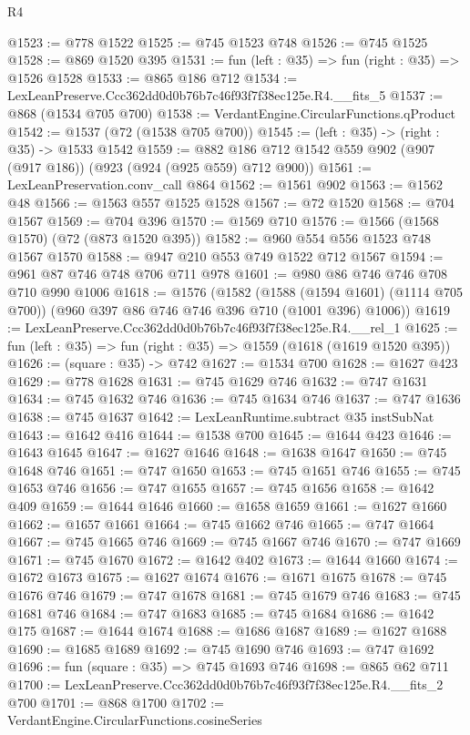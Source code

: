 \begin{lexlean}{R4}
\begin{coremodule}
@1523 := @778 @1522
@1525 := @745 @1523 @748
@1526 := @745 @1525
@1528 := @869 @1520 @395
@1531 := fun (left : @35) => fun (right : @35) => @1526 @1528
@1533 := @865 @186 @712
@1534 := LexLeanPreserve.Ccc362dd0d0b76b7c46f93f7f38ec125e.R4.__fits_5
@1537 := @868 (@1534 @705 @700)
@1538 := VerdantEngine.CircularFunctions.qProduct
@1542 := @1537 (@72 (@1538 @705 @700))
@1545 := (left : @35) -> (right : @35) -> @1533 @1542
@1559 := @882 @186 @712 @1542 @559 @902 (@907 (@917 @186)) (@923 (@924 (@925 @559) @712 @900))
@1561 := LexLeanPreservation.conv_call @864
@1562 := @1561 @902
@1563 := @1562 @48
@1566 := @1563 @557 @1525 @1528
@1567 := @72 @1520
@1568 := @704 @1567
@1569 := @704 @396
@1570 := @1569 @710
@1576 := @1566 (@1568 @1570) (@72 (@873 @1520 @395))
@1582 := @960 @554 @556 @1523 @748 @1567 @1570
@1588 := @947 @210 @553 @749 @1522 @712 @1567
@1594 := @961 @87 @746 @748 @706 @711 @978
@1601 := @980 @86 @746 @746 @708 @710 @990 @1006
@1618 := @1576
    (@1582
      (@1588 (@1594 @1601) (@1114 @705 @700))
      (@960 @397 @86 @746 @746 @396 @710 (@1001 @396) @1006))
@1619 := LexLeanPreserve.Ccc362dd0d0b76b7c46f93f7f38ec125e.R4.__rel_1
@1625 := fun (left : @35) => fun (right : @35) => @1559 (@1618 (@1619 @1520 @395))
@1626 := (square : @35) -> @742
@1627 := @1534 @700
@1628 := @1627 @423
@1629 := @778 @1628
@1631 := @745 @1629 @746
@1632 := @747 @1631
@1634 := @745 @1632 @746
@1636 := @745 @1634 @746
@1637 := @747 @1636
@1638 := @745 @1637
@1642 := LexLeanRuntime.subtract @35 instSubNat
@1643 := @1642 @416
@1644 := @1538 @700
@1645 := @1644 @423
@1646 := @1643 @1645
@1647 := @1627 @1646
@1648 := @1638 @1647
@1650 := @745 @1648 @746
@1651 := @747 @1650
@1653 := @745 @1651 @746
@1655 := @745 @1653 @746
@1656 := @747 @1655
@1657 := @745 @1656
@1658 := @1642 @409
@1659 := @1644 @1646
@1660 := @1658 @1659
@1661 := @1627 @1660
@1662 := @1657 @1661
@1664 := @745 @1662 @746
@1665 := @747 @1664
@1667 := @745 @1665 @746
@1669 := @745 @1667 @746
@1670 := @747 @1669
@1671 := @745 @1670
@1672 := @1642 @402
@1673 := @1644 @1660
@1674 := @1672 @1673
@1675 := @1627 @1674
@1676 := @1671 @1675
@1678 := @745 @1676 @746
@1679 := @747 @1678
@1681 := @745 @1679 @746
@1683 := @745 @1681 @746
@1684 := @747 @1683
@1685 := @745 @1684
@1686 := @1642 @175
@1687 := @1644 @1674
@1688 := @1686 @1687
@1689 := @1627 @1688
@1690 := @1685 @1689
@1692 := @745 @1690 @746
@1693 := @747 @1692
@1696 := fun (square : @35) => @745 @1693 @746
@1698 := @865 @62 @711
@1700 := LexLeanPreserve.Ccc362dd0d0b76b7c46f93f7f38ec125e.R4.__fits_2 @700
@1701 := @868 @1700
@1702 := VerdantEngine.CircularFunctions.cosineSeries

\end{coremodule}
\end{lexlean}

